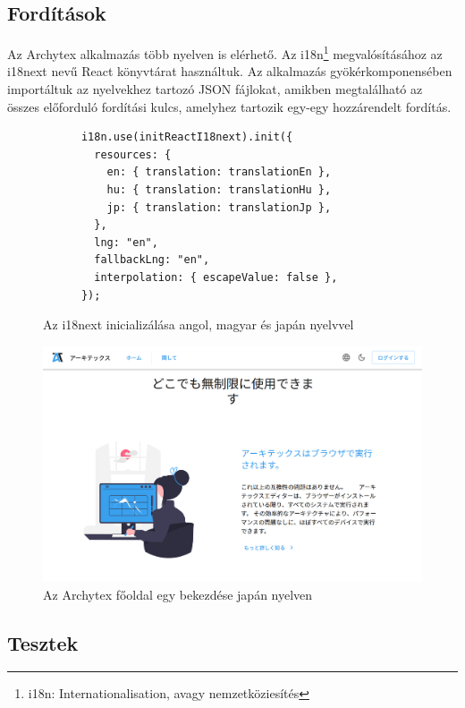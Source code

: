 \subsection{Fordítások}
Az Archytex alkalmazás több nyelven is elérhető. Az i18n\footnote{i18n: Internationalisation, avagy nemzetköziesítés}  megvalósításához az i18next nevű React könyvtárat használtuk. Az alkalmazás gyökérkomponensében importáltuk az nyelvekhez tartozó JSON fájlokat, amikben megtalálható az összes előforduló fordítási kulcs, amelyhez tartozik egy-egy hozzárendelt fordítás.

\begin{figure}[h]
  \centering
  \begin{minipage}{.7\textwidth}
    \centering
    \begin{lstlisting}
      i18n.use(initReactI18next).init({
        resources: {
          en: { translation: translationEn },
          hu: { translation: translationHu },
          jp: { translation: translationJp },
        },
        lng: "en",
        fallbackLng: "en",
        interpolation: { escapeValue: false },
      });\end{lstlisting}
  \end{minipage}
  \caption{Az i18next inicializálása angol, magyar és japán nyelvvel}
\end{figure}

\begin{figure}[h]
  \centering
  \includegraphics[width=.6\textwidth]{parts/developer-documentation/frontend/images/translated.png}
  \caption{Az Archytex főoldal egy bekezdése japán nyelven}
\end{figure}

\subsection{Tesztek}
